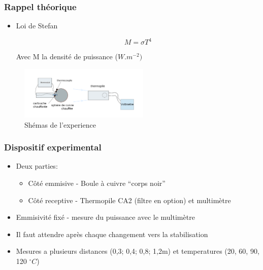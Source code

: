 \documentclass{beamer}
\newcommand{\newlines}{\newline\newline}
\begin{document}
\begin{frame}
\frametitle{Rappel théorique}

\begin{itemize}
	\item{ Loi de Stefan}

    \[
    M= \sigma T^4
    \]

    Avec M la densité de puissance ($W.m^{-2})$

\end{itemize}



\begin{figure}
\includegraphics[height=1in]{Fig/shemas.png}
\caption{Shémas de l'experience}
\end{figure}

\end{frame}






\begin{frame}
\frametitle{Dispositif experimental}

\begin{itemize}
	\item{Deux parties:\newline
	\begin{itemize}
		\item{Côté emmisive - Boule à cuivre ``corps noir''\newline}
		\item{Côté receptive - Thermopile CA2 (filtre en option) et multimètre\newlines}
	\end{itemize}}
	\item{Emmisivité fixé - mesure du puissance avec le multimètre\newline}
	\item{Il faut attendre après chaque changement vers la stabilisation\newline}
	\item{Mesures a plusieurs distances (0,3; 0,4; 0,8; 1,2m) et temperatures (20, 60, 90, 120 $^\circ C$)}
	
\end{itemize}	
	
\end{frame}
\end{document}
